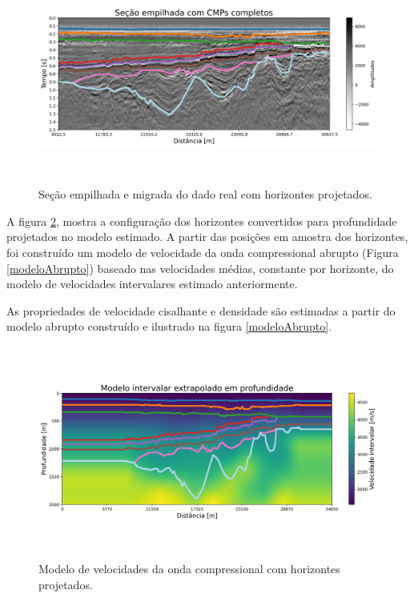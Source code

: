 \documentclass[
	12pt,				%
	openright,			%
	oneside,			%
	a4paper,			%
	english,			%
	brazil				%
	]{abntex2}
\begin{document}
	\begin{figure}[htp!]
		\centering
		\includegraphics[width=16cm,height=7cm]{../imagens/sectionHrz.png}
		\caption{Seção empilhada e migrada do dado real com horizontes projetados.}
		\label{sismicaHorizontes}
	\end{figure}

	A figura \ref{modeloHorizontes}, mostra a configuração dos horizontes convertidos para profundidade projetados no modelo estimado. A partir das posições em amostra dos horizontes, foi construído um modelo de velocidade da onda compressional abrupto (Figura \ref{modeloAbrupto}) baseado nas velocidades médias, constante por horizonte, do modelo de velocidades intervalares estimado anteriormente.  
	
	As propriedades de velocidade cisalhante e densidade são estimadas a partir do modelo abrupto construído e ilustrado na figura \ref{modeloAbrupto}.  

	\begin{figure}[htp!]
		\centering
		\includegraphics[width=16cm,height=7cm]{../imagens/modeloExtrapoladoINTHRZ.png}
		\caption{Modelo de velocidades da onda compressional com horizontes projetados.}
		\label{modeloHorizontes}
	\end{figure}
\end{document}
